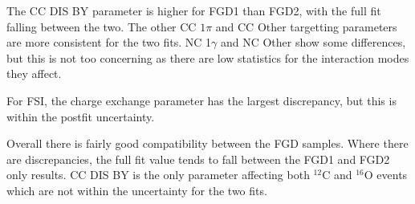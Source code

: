 The CC DIS BY parameter is higher for FGD1 than FGD2, with the full fit falling between the two. The other CC $1\pi$ and CC Other targetting parameters are more consistent for the two fits. NC 1$\gamma$ and NC Other show some differences, but this is not too concerning as there are low statistics for the interaction modes they affect.

For FSI, the charge exchange parameter has the largest discrepancy, but this is within the postfit uncertainty.

Overall there is fairly good compatibility between the FGD samples. Where there are discrepancies, the full fit value tends to fall between the FGD1 and FGD2 only results. CC DIS BY is the only parameter affecting both $^{12}$C and $^{16}$O events which are not within the uncertainty for the two fits. 

